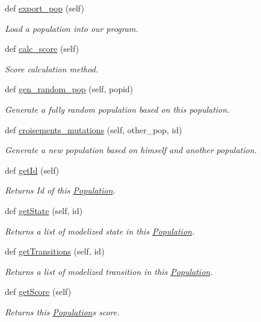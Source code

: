 \begin{DoxyCompactItemize}
def \mbox{\hyperlink{classPopulation_1_1Population_a4cc44224df33f24169a98661748e7fca}{export\+\_\+pop}} (self)
\begin{DoxyCompactList}\small\item\em Load a population into our program. \end{DoxyCompactList}\item 
def \mbox{\hyperlink{classPopulation_1_1Population_a86a6820d2ac05095a9b9cef2ec60e533}{calc\+\_\+score}} (self)
\begin{DoxyCompactList}\small\item\em Score calculation method. \end{DoxyCompactList}\item 
def \mbox{\hyperlink{classPopulation_1_1Population_abc84fe3de4076d70b62cda01207eb0bb}{gen\+\_\+random\+\_\+pop}} (self, popid)
\begin{DoxyCompactList}\small\item\em Generate a fully random population based on this population. \end{DoxyCompactList}\item 
def \mbox{\hyperlink{classPopulation_1_1Population_a272d86ca139afe3150dff771d71cfea7}{croisements\+\_\+mutations}} (self, other\+\_\+pop, id)
\begin{DoxyCompactList}\small\item\em Generate a new population based on himself and another population. \end{DoxyCompactList}\item 
def \mbox{\hyperlink{classPopulation_1_1Population_ac97f6af1eb7b996b529bbb00cb56f147}{get\+Id}} (self)
\begin{DoxyCompactList}\small\item\em Returns Id of this \mbox{\hyperlink{classPopulation_1_1Population}{Population}}. \end{DoxyCompactList}\item 
def \mbox{\hyperlink{classPopulation_1_1Population_a69e191c3b2aa8d415858bc358658d31f}{get\+State}} (self, id)
\begin{DoxyCompactList}\small\item\em Returns a list of modelized state in this \mbox{\hyperlink{classPopulation_1_1Population}{Population}}. \end{DoxyCompactList}\item 
def \mbox{\hyperlink{classPopulation_1_1Population_a03c2737cca878a0929f5a183fe6e5106}{get\+Transitions}} (self, id)
\begin{DoxyCompactList}\small\item\em Returns a list of modelized transition in this \mbox{\hyperlink{classPopulation_1_1Population}{Population}}. \end{DoxyCompactList}\item 
def \mbox{\hyperlink{classPopulation_1_1Population_a19c0905329170d9cadec9b7b6ed04c4c}{get\+Score}} (self)
\begin{DoxyCompactList}\small\item\em Returns this \mbox{\hyperlink{classPopulation_1_1Population}{Population}}\textquotesingle{}s score. \end{DoxyCompactList}\end{DoxyCompactItemize}
